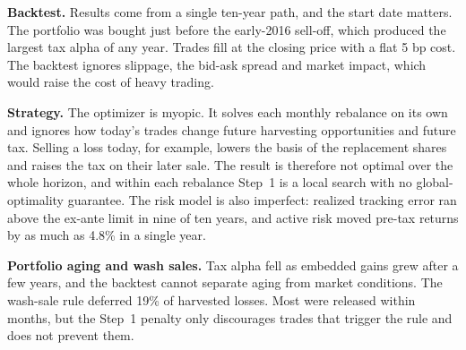 \textbf{Backtest.} Results come from a single ten-year path, and the start date matters. The portfolio was bought just before the early-2016 sell-off, which produced the largest tax alpha of any year. Trades fill at the closing price with a flat 5 bp cost. The backtest ignores slippage, the bid-ask spread and market impact, which would raise the cost of heavy trading.

\textbf{Strategy.} The optimizer is myopic. It solves each monthly rebalance on its own and ignores how today's trades change future harvesting opportunities and future tax. Selling a loss today, for example, lowers the basis of the replacement shares and raises the tax on their later sale. The result is therefore not optimal over the whole horizon, and within each rebalance Step~1 is a local search with no global-optimality guarantee. The risk model is also imperfect: realized tracking error ran above the ex-ante limit in nine of ten years, and active risk moved pre-tax returns by as much as 4.8\% in a single year.

\textbf{Portfolio aging and wash sales.} Tax alpha fell as embedded gains grew after a few years, and the backtest cannot separate aging from market conditions. The wash-sale rule deferred 19\% of harvested losses. Most were released within months, but the Step~1 penalty only discourages trades that trigger the rule and does not prevent them.
